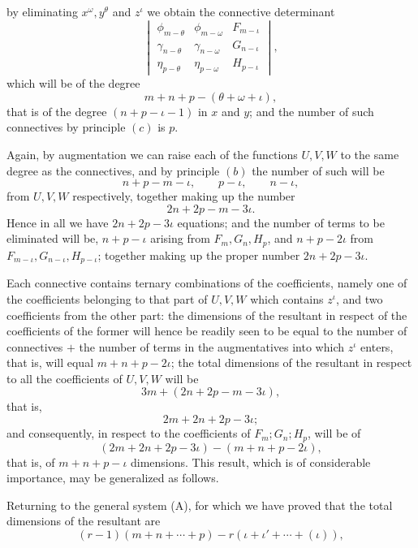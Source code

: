 \documentclass[11pt]{article}
\newcommand{\sourcepage}[1]{\marginpar{\scriptsize p.~#1}}
\begin{document}
{{\sourcepage{260}
by eliminating $x^\omega,y^\theta$ and $z^\iota$ we obtain the connective determinant
\[
\begin{vmatrix}
\phi_{m-\theta}&\phi_{m-\omega}&F_{m-\iota}\\
\gamma_{n-\theta}&\gamma_{n-\omega}&G_{n-\iota}\\
\eta_{p-\theta}&\eta_{p-\omega}&H_{p-\iota}
\end{vmatrix},
\]
which will be of the degree
\[
m+n+p-(\theta+\omega+\iota),
\]
that is of the degree $(n+p-\iota-1)$ in $x$ and $y$; and the number of such connectives by principle $(c)$ is $p$.

Again, by augmentation we can raise each of the functions $U,V,W$ to the same degree as the connectives, and by principle $(b)$ the number of such will be
\[
n+p-m-\iota,
\qquad p-\iota,
\qquad n-\iota,
\]
from $U,V,W$ respectively, together making up the number
\[
2n+2p-m-3\iota.
\]
Hence in all we have $2n+2p-3\iota$ equations; and the number of terms to be eliminated will be, $n+p-\iota$ arising from $F_m,G_n,H_p$, and $n+p-2\iota$ from $F_{m-\iota},G_{n-\iota},H_{p-\iota}$; together making up the proper number $2n+2p-3\iota$.

Each connective contains ternary combinations of the coefficients, namely one of the coefficients belonging to that part of $U,V,W$ which contains $z^\iota$, and two coefficients from the other part: the dimensions of the resultant in respect of the coefficients of the former will hence be readily seen to be equal to the number of connectives $+$ the number of terms in the augmentatives into which $z^\iota$ enters, that is, will equal $m+n+p-2\iota$; the total dimensions of the resultant in respect to all the coefficients of $U,V,W$ will be
\[
3m+(2n+2p-m-3\iota),
\]
that is,
\[
2m+2n+2p-3\iota;
\]
and consequently, in respect to the coefficients of $F_m;G_n;H_p$, will be of
\[
(2m+2n+2p-3\iota)-(m+n+p-2\iota),
\]
that is, of $m+n+p-\iota$ dimensions. This result, which is of considerable importance, may be generalized as follows.

Returning to the general system (A), for which we have proved that the total dimensions of the resultant are
\[
(r-1)(m+n+\cdots+p)-r(\iota+\iota'+\cdots+(\iota)),
\]

}}
\end{document}
